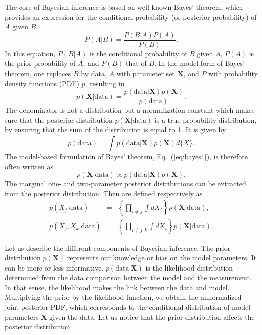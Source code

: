 The core of Bayesian inference is based on well-known Bayes' theorem, 
which provides an expression for the conditional probability (or posterior
probability) of $A$ given $B$,
%
\begin{equation}
  P(A|B) = \frac{P(B|A)P(A)}{P(B)}.
\end{equation}
%
In this equation, $P(B|A)$ is the conditional probability of $B$ given $A$, 
$P(A)$ is the prior probability of $A$, and $P(B)$ that of $B$.
In the model form of Bayes' theorem, one replaces $B$ by data, $A$ with 
parameter set $\bm{X}$, and $P$ with probability density functions (PDF) 
$p$, resulting in~\cite{Bayes}
%
\begin{equation}
  p(\bm{X}|\text{data}) = \frac{p(\text{data}|\bm{X})
  p(\bm{X})}{p(\text{data})}.\label{eq:bayes1}
\end{equation}
%
The denominator is not a distribution but a normalization constant which makes 
sure that the posterior distribution $p(\bm{X}|\text{data})$ is a 
true probability distribution, by ensuring that the sum of the distribution is 
equal to 1. It is given by
%
\begin{equation}
  p(\text{data}) = \int p(\text{data}|\bm{X})p(\bm{X})
  d\{X\}.
\end{equation}
%
The model-based formulation of Bayes' theorem, Eq.~(\ref{eq:bayes1}), is 
therefore often written as
%
\begin{equation}
  p(\bm{X}|\text{data}) \propto p(\text{data}|\bm{X})
  p(\bm{X}).
\end{equation}
%
The marginal one- and two-parameter posterior distributions can be extracted
from the posterior distribution. Then are defined respectively as
%
\begin{eqnarray}
  p(X_j|\text{data}) &=& \left\{\prod_{i \neq j} \int
  dX_i\right\}p(\bm{X}|\text{data}),\\
  p(X_j,X_k|\text{data}) &=& \left\{\prod_{i \neq j,k} 
    \int dX_i\right\}p(\bm{X}|\text{data}).
\end{eqnarray}
%

Let us describe the different components of Bayesian inference. The 
prior distribution $p(\bm{X})$ represents our knowledge or bias on the 
model parameters. It can be more or less informative. 
$p(\text{data}|\bm{X})$ is the likelihood distribution determined from 
the data comparison between the model and the measurement. In that sense, the 
likelihood makes the link between the data and model. Multiplying the prior by 
the likelihood function, we obtain the unnormalized joint posterior PDF, which 
corresponds to the conditional distribution of model parameters $\bm{X}$ 
given the data. Let us notice that the prior distribution affects the posterior
distribution. 

